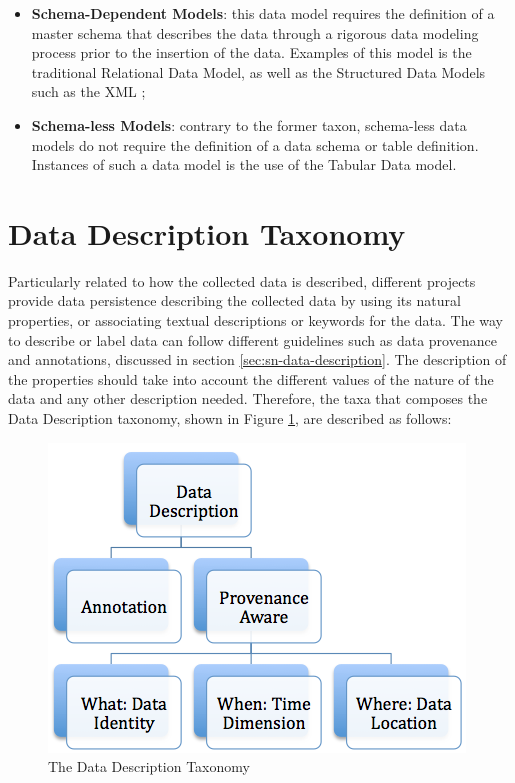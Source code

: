\begin{itemize}
  \item \textbf{Schema-Dependent Models}: this data model requires the
  definition of a master schema that describes the data through a rigorous
  data modeling process prior to the insertion of the data. Examples of this
  model is the traditional Relational Data Model\cite{relational-model}, as
 well as the Structured Data Models such as the XML \cite{xml};
  \item \textbf{Schema-less Models}: contrary to the former taxon, schema-less
  data models do not require the definition of a data schema or table
  definition. Instances of such a data model is the use of the 
  Tabular Data model.
\end{itemize}

\section{Data Description Taxonomy}

Particularly related to how the collected data is described, different projects
provide data persistence describing the collected data by using its natural
properties, or associating textual descriptions or keywords for the data. The
way to describe or label data can follow different guidelines such as data provenance
and annotations, discussed in section \ref{sec:sn-data-description}. The description of the
properties should take into account the different values of the nature of the
data and any other description needed. Therefore, the taxa that composes the
Data Description taxonomy, shown in Figure
\ref{fig:taxonomy-data-description}, are described as follows:

\begin{figure}[h]
  \centering
  \includegraphics[scale=0.5]{../diagrams/taxonomy-data-description}
  \caption{The Data Description Taxonomy}
  \label{fig:taxonomy-data-description}
\end{figure}

